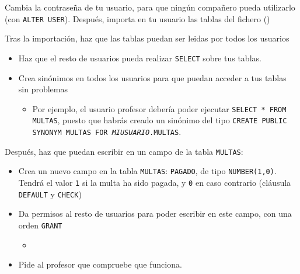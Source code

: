 \begin{homeworkProblem}
  Cambia la contraseña de tu usuario, para que ningún compañero pueda utilizarlo (con \texttt{ALTER USER}). Después, importa en tu usuario las tablas del fichero  ()

  Tras la importación, haz que las tablas puedan ser leidas por todos los usuarios
  \begin{itemize}
  \item Haz que el resto de usuarios pueda realizar \texttt{SELECT} sobre tus tablas.  
  \item Crea sinónimos en todos los usuarios para que puedan acceder a tus tablas sin problemas
    \begin{itemize}
    \item Por ejemplo, el usuario profesor debería poder ejecutar \texttt{SELECT * FROM MULTAS}, puesto que habrás creado un sinónimo del tipo \texttt{CREATE PUBLIC SYNONYM MULTAS FOR \textit{MIUSUARIO}.MULTAS}.
    \end{itemize}
  \end{itemize}

  Después, haz que puedan escribir en un campo de la tabla \texttt{MULTAS}:
  \begin{itemize}
  \item Crea un nuevo campo en la tabla \texttt{MULTAS}: \texttt{PAGADO}, de tipo \texttt{NUMBER(1,0)}. Tendrá el valor \texttt{1} si la multa ha sido pagada, y \texttt{0} en caso contrario (cláusula \texttt{DEFAULT} y \texttt{CHECK})
    
  \item Da permisos al resto de usuarios para poder escribir en este campo, con una orden \texttt{GRANT}
    \begin{itemize}
    \item {}
    \end{itemize}
    
  \item Pide al profesor que compruebe que funciona.

  \end{itemize}
  

\end{homeworkProblem}


